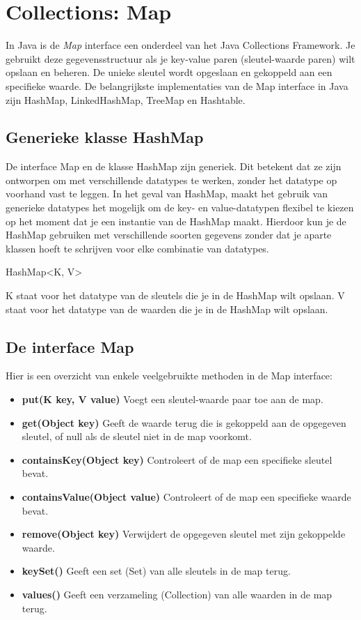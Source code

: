 \chapter{Collections: Map}

In Java is de \textit{Map} interface een onderdeel van het Java Collections Framework. 
Je gebruikt deze gegevensstructuur als je key-value paren (sleutel-waarde paren) wilt opslaan en beheren.  De unieke sleutel wordt opgeslaan en gekoppeld aan een specifieke waarde.  De belangrijkste implementaties van de Map interface in Java zijn HashMap, LinkedHashMap, TreeMap en Hashtable.

\section{Generieke klasse HashMap}

De interface Map en de klasse HashMap zijn generiek.  Dit betekent dat ze zijn ontworpen om met verschillende datatypes te werken, zonder het datatype op voorhand vast te leggen. In het geval van HashMap, maakt het gebruik van generieke datatypes het mogelijk om de key- en value-datatypen flexibel te kiezen op het moment dat je een instantie van de HashMap maakt. Hierdoor kun je de HashMap gebruiken met verschillende soorten gegevens zonder dat je aparte klassen hoeft te schrijven voor elke combinatie van datatypes.

HashMap<K, V>

K staat voor het datatype van de sleutels die je in de HashMap wilt opslaan.
V staat voor het datatype van de waarden die je in de HashMap wilt opslaan.

\section{De interface Map}

Hier is een overzicht van enkele veelgebruikte methoden in de Map interface:

\begin{itemize}
\item \textbf{put(K key, V value)} Voegt een sleutel-waarde paar toe aan de map.
\item \textbf{get(Object key)} Geeft de waarde terug die is gekoppeld aan de opgegeven sleutel, of null als de sleutel niet in de map voorkomt.
\item \textbf{containsKey(Object key)} Controleert of de map een specifieke sleutel bevat.
\item \textbf{containsValue(Object value)} Controleert of de map een specifieke waarde bevat.
\item \textbf{remove(Object key)} Verwijdert de opgegeven sleutel met zijn gekoppelde waarde.
\item \textbf{keySet()} Geeft een set (Set) van alle sleutels in de map terug.
\item \textbf{values()} Geeft een verzameling (Collection) van alle waarden in de map terug.
\end{itemize}



